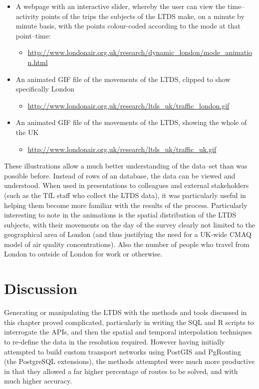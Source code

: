 \begin{itemize}
\item A webpage with an interactive slider, whereby the user can view the time--activity points of the trips the subjects of the LTDS make, on a minute by minute basis, with the points colour-coded according to the mode at that point--time:
\begin{itemize}
\item \url{http://www.londonair.org.uk/research/dynamic_london/mode_animation.html}
\end{itemize}
\item An animated GIF file of the movements of the LTDS, clipped to show specifically London
\begin{itemize}
\item \url{http://www.londonair.org.uk/research/ltds_uk/traffic_london.gif}
\end{itemize}
\item An animated GIF file of the movements of the LTDS, showing the whole of the UK
\begin{itemize}
\item \url{http://www.londonair.org.uk/research/ltds_uk/traffic_uk.gif}
\end{itemize}
\end{itemize}

These illustrations allow a much better understanding of the data--set than was possible before. Instead of rows of an database, the data can be viewed and understood. When used in presentations to colleagues and external stakeholders (such as the TfL staff who collect the LTDS data), it was particularly useful in helping them become more familiar with the results of the process. Particularly interesting to note in the animations is the spatial distribution of the LTDS subjects, with their movements on the day of the survey clearly not limited to the geographical area of London (and thus justifying the need for a UK-wide CMAQ model of air quality concentrations). Also the number of people who travel from London to outside of London for work or otherwise.

\section{Discussion}
\label{sec:1Discussion}

Generating or manipulating the LTDS with the methods and tools discussed in this chapter proved complicated, particularly in writing the SQL and R scripts to interrogate the APIs, and then the spatial and temporal interpolation techniques to re-define the data in the resolution required. However having initially attempted to build custom transport networks using PostGIS and PgRouting (the PostgreSQL extensions), the methods attempted were much more productive in that they allowed a far higher percentage of routes to be solved, and with much higher accuracy. 

